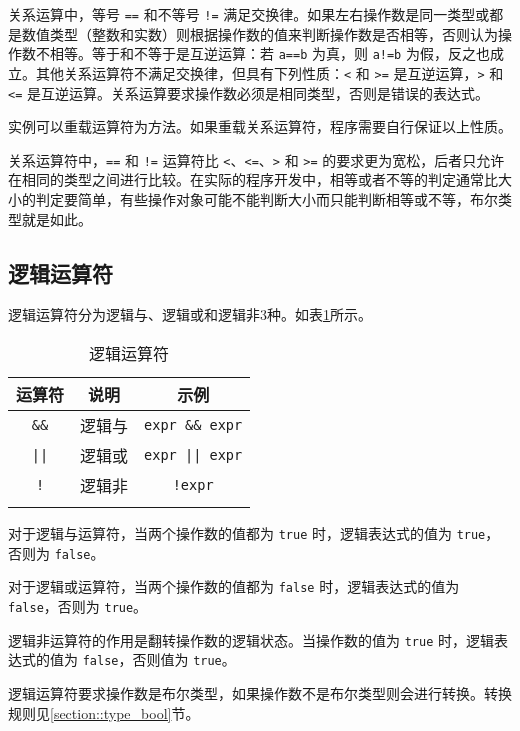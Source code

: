 关系运算中，等号 \texttt{==} 和不等号 \texttt{!=} 满足交换律。如果左右操作数是同一类型或都是数值类型（整数和实数）则根据操作数的值来判断操作数是否相等，否则认为操作数不相等。等于和不等于是互逆运算：若 \texttt{a==b} 为真，则 \texttt{a!=b} 为假，反之也成立。其他关系运算符不满足交换律，但具有下列性质：\texttt{<} 和 \texttt{>=} 是互逆运算，\texttt{>} 和 \texttt{<=} 是互逆运算。关系运算要求操作数必须是相同类型，否则是错误的表达式。

实例可以重载运算符为方法。如果重载关系运算符，程序需要自行保证以上性质。

关系运算符中，\texttt{==} 和 \texttt{!=} 运算符比 \texttt{<}、\texttt{<=}、\texttt{>} 和 \texttt{>=} 的要求更为宽松，后者只允许在相同的类型之间进行比较。在实际的程序开发中，相等或者不等的判定通常比大小的判定要简单，有些操作对象可能不能判断大小而只能判断相等或不等，布尔类型就是如此。

\subsection{逻辑运算符}

逻辑运算符分为逻辑与、逻辑或和逻辑非3种。如表\ref{tab::logic_operator}所示。

\begin{table}[htb]
    \centering
    \setlength{\tabcolsep}{10mm}
    \begin{tabular}{ccc} \Xhline{1pt}
        \textbf{运算符} & \textbf{说明} & \textbf{示例} \\ \hline
        \texttt{\&\&} & 逻辑与 & \texttt{expr \&\& expr} \\
        \texttt{||} & 逻辑或 & \texttt{expr || expr} \\
        \texttt{!} & 逻辑非 & \texttt{!expr} \\
        \Xhline{1pt}
    \end{tabular}
    \caption{逻辑运算符}
    \label{tab::logic_operator}
\end{table}

对于逻辑与运算符，当两个操作数的值都为 \texttt{true} 时，逻辑表达式的值为 \texttt{true}，否则为 \texttt{false}。

对于逻辑或运算符，当两个操作数的值都为 \texttt{false} 时，逻辑表达式的值为 \texttt{false}，否则为 \texttt{true}。

逻辑非运算符的作用是翻转操作数的逻辑状态。当操作数的值为 \texttt{true} 时，逻辑表达式的值为 \texttt{false}，否则值为 \texttt{true}。

逻辑运算符要求操作数是布尔类型，如果操作数不是布尔类型则会进行转换。转换规则见\ref{section::type_bool}节。

